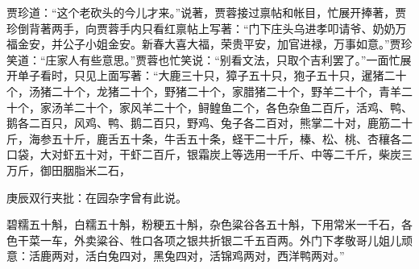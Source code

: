 \begin{parag}


    贾珍道：“这个老砍头的今儿才来。”说著，贾蓉接过禀帖和帐目，忙展开捧著，贾珍倒背著两手，向贾蓉手内只看红禀帖上写著：“门下庄头乌进孝叩请爷、奶奶万福金安，并公子小姐金安。新春大喜大福，荣贵平安，加官进禄，万事如意。”贾珍笑道：“庄家人有些意思。”贾蓉也忙笑说：“别看文法，只取个吉利罢了。”一面忙展开单子看时，只见上面写著：“大鹿三十只，獐子五十只，狍子五十只，暹猪二十个，汤猪二十个，龙猪二十个，野猪二十个，家腊猪二十个，野羊二十个，青羊二十个，家汤羊二十个，家风羊二十个，鲟鳇鱼二个，各色杂鱼二百斤，活鸡、鸭、鹅各二百只，风鸡、鸭、鹅二百只，野鸡、兔子各二百对，熊掌二十对，鹿筋二十斤，海参五十斤，鹿舌五十条，牛舌五十条，蛏干二十斤，榛、松、桃、杏穰各二口袋，大对虾五十对，干虾二百斤，银霜炭上等选用一千斤、中等二千斤，柴炭三万斤，御田胭脂米二石，\begin{note}庚辰双行夹批：在园杂字曾有此说。\end{note}碧糯五十斛，白糯五十斛，粉粳五十斛，杂色粱谷各五十斛，下用常米一千石，各色干菜一车，外卖粱谷、牲口各项之银共折银二千五百两。外门下孝敬哥儿姐儿顽意：活鹿两对，活白兔四对，黑兔四对，活锦鸡两对，西洋鸭两对。”
\end{parag}


